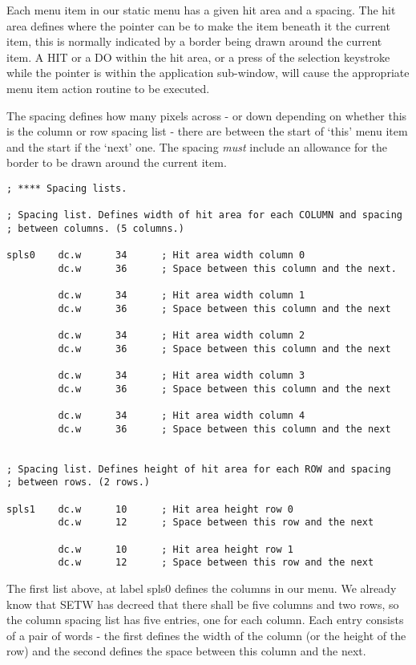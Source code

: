 Each menu item in our static menu has a given hit area and a
    spacing. The hit area defines where the pointer can be to make the item
    beneath it the current item, this is normally indicated by a border being
    drawn around the current item. A HIT or a DO within the hit area, or a
    press of the selection keystroke while the pointer is within the
    application sub-{}window, will cause the appropriate menu item action
    routine to be executed.

The spacing defines how many pixels across -{} or down depending on
    whether this is the column or row spacing list -{} there are between the
    start of `this' menu item and the start if the `next' one. The spacing
 \emph{must} include an allowance for the border to be drawn
    around the current item.

\begin{lstlisting}[firstnumber=42,caption={AppMenuTest1Win\_asm - Spacing Lists}]
; **** Spacing lists.

; Spacing list. Defines width of hit area for each COLUMN and spacing
; between columns. (5 columns.)

spls0    dc.w      34      ; Hit area width column 0
         dc.w      36      ; Space between this column and the next.

         dc.w      34      ; Hit area width column 1
         dc.w      36      ; Space between this column and the next

         dc.w      34      ; Hit area width column 2
         dc.w      36      ; Space between this column and the next

         dc.w      34      ; Hit area width column 3
         dc.w      36      ; Space between this column and the next

         dc.w      34      ; Hit area width column 4
         dc.w      36      ; Space between this column and the next


; Spacing list. Defines height of hit area for each ROW and spacing
; between rows. (2 rows.)

spls1    dc.w      10      ; Hit area height row 0
         dc.w      12      ; Space between this row and the next

         dc.w      10      ; Hit area height row 1
         dc.w      12      ; Space between this row and the next
\end{lstlisting}

The first list above, at label spls0 defines the columns in our
    menu. We already know that SETW has decreed
    that there shall be five columns and two rows, so the column spacing list
    has five entries, one for each column. Each entry consists of a pair of
    words -{} the first defines the width of the column (or the height of the
    row) and the second defines the space between this column and the
    next.

